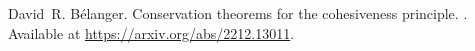 David~R. B{\'e}langer.
\newblock Conservation theorems for the cohesiveness principle.
.
\newblock Available at \url{https://arxiv.org/abs/2212.13011}.
